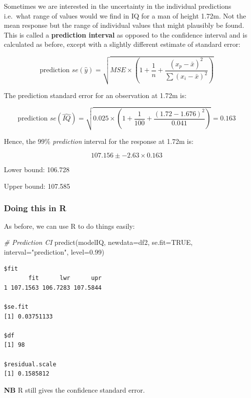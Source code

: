 \documentclass[
  oneside]{krantz}
\newenvironment{Shaded}{\begin{snugshade}}{\end{snugshade}}
\newcommand{\AttributeTok}[1]{\textcolor[rgb]{0.77,0.63,0.00}{#1}}
\newcommand{\CommentTok}[1]{\textcolor[rgb]{0.56,0.35,0.01}{\textit{#1}}}
\newcommand{\ConstantTok}[1]{\textcolor[rgb]{0.00,0.00,0.00}{#1}}
\newcommand{\FloatTok}[1]{\textcolor[rgb]{0.00,0.00,0.81}{#1}}
\newcommand{\FunctionTok}[1]{\textcolor[rgb]{0.00,0.00,0.00}{#1}}
\newcommand{\NormalTok}[1]{#1}
\newcommand{\StringTok}[1]{\textcolor[rgb]{0.31,0.60,0.02}{#1}}
\begin{document}
Sometimes we are interested in the uncertainty in the individual predictions i.e.~what range of values would we find in IQ for a man of height 1.72m. Not the mean response but the range of individual values that might plausibly be found. This is called a \textbf{prediction interval} as opposed to the confidence interval and is calculated as before, except with a slightly different estimate of standard error:

\[\textrm{prediction }se(\hat{y})=\sqrt{MSE\times (1+\frac{1}{n}+\frac{(x_p-\bar{x})^2}{\sum{(x_i-\bar{x})^2}})}\]

The prediction standard error for an observation at 1.72m is:

\[\textrm{prediction }se(\hat{IQ})=\sqrt{0.025\times (1+ \frac{1}{100}+\frac{(1.72-1.676)^2}{0.041})} =0.163\]

Hence, the 99\% \emph{prediction} interval for the response at 1.72m is:

\[107.156 \pm -2.63\times 0.163\]

Lower bound: 106.728

Upper bound: 107.585

\hypertarget{doing-this-in-r-29}{%
\subsubsection{Doing this in R}\label{doing-this-in-r-29}}

As before, we can use R to do things easily:

\begin{Shaded}
\begin{Highlighting}[]
\CommentTok{\# Prediction CI}
\FunctionTok{predict}\NormalTok{(modelIQ, }\AttributeTok{newdata=}\NormalTok{df2, }\AttributeTok{se.fit=}\ConstantTok{TRUE}\NormalTok{, }\AttributeTok{interval=}\StringTok{"prediction"}\NormalTok{, }\AttributeTok{level=}\FloatTok{0.99}\NormalTok{)}
\end{Highlighting}
\end{Shaded}

\begin{verbatim}
$fit
       fit      lwr      upr
1 107.1563 106.7283 107.5844

$se.fit
[1] 0.03751133

$df
[1] 98

$residual.scale
[1] 0.1585812
\end{verbatim}

\textbf{NB} R still gives the confidence standard error.
\end{document}

